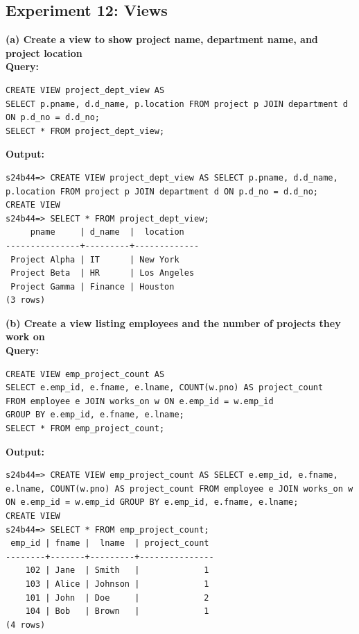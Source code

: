\documentclass[12pt, a4paper]{article}
\begin{document}
\newpage
\subsection*{Experiment 12: Views}

\textbf{(a) Create a view to show project name, department name, and project location}\\
\textbf{Query:}
\begin{lstlisting}
CREATE VIEW project_dept_view AS
SELECT p.pname, d.d_name, p.location FROM project p JOIN department d ON p.d_no = d.d_no;
SELECT * FROM project_dept_view;
\end{lstlisting}
\textbf{Output:}
\begin{lstlisting}[style=terminal]
s24b44=> CREATE VIEW project_dept_view AS SELECT p.pname, d.d_name, p.location FROM project p JOIN department d ON p.d_no = d.d_no;
CREATE VIEW
s24b44=> SELECT * FROM project_dept_view;
     pname     | d_name  |  location   
---------------+---------+-------------
 Project Alpha | IT      | New York
 Project Beta  | HR      | Los Angeles
 Project Gamma | Finance | Houston
(3 rows)
\end{lstlisting}

\textbf{(b) Create a view listing employees and the number of projects they work on}\\
\textbf{Query:}
\begin{lstlisting}
CREATE VIEW emp_project_count AS
SELECT e.emp_id, e.fname, e.lname, COUNT(w.pno) AS project_count 
FROM employee e JOIN works_on w ON e.emp_id = w.emp_id 
GROUP BY e.emp_id, e.fname, e.lname;
SELECT * FROM emp_project_count;
\end{lstlisting}
\textbf{Output:}
\begin{lstlisting}[style=terminal]
s24b44=> CREATE VIEW emp_project_count AS SELECT e.emp_id, e.fname, e.lname, COUNT(w.pno) AS project_count FROM employee e JOIN works_on w ON e.emp_id = w.emp_id GROUP BY e.emp_id, e.fname, e.lname;
CREATE VIEW
s24b44=> SELECT * FROM emp_project_count;
 emp_id | fname |  lname  | project_count 
--------+-------+---------+---------------
    102 | Jane  | Smith   |             1
    103 | Alice | Johnson |             1
    101 | John  | Doe     |             2
    104 | Bob   | Brown   |             1
(4 rows)
\end{lstlisting}
\end{document}
